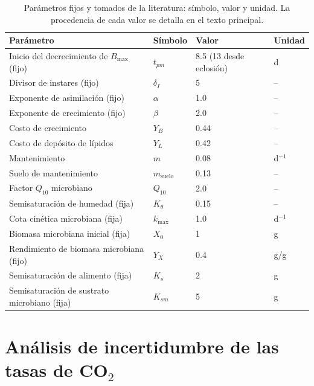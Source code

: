 \documentclass[11pt,a4paper]{article}
\begin{document}
\begin{table}[htbp]
\centering
\caption{Parámetros fijos y tomados de la literatura: símbolo, valor y unidad. La procedencia de cada valor se detalla en el texto principal.}
\label{tab:paramfijos}
\begin{tabular}{llll}
\toprule
Parámetro & Símbolo & Valor & Unidad \\
\midrule
Inicio del decrecimiento de $B_{\max}$ (fijo) & $t_{pm}$ & 8.5 (13 desde eclosión) & d \\
Divisor de instares (fijo) & $\delta_I$ & 5 & -- \\
Exponente de asimilación (fijo) & $\alpha$ & 1.0 & -- \\
Exponente de crecimiento (fijo) & $\beta$ & 2.0 & -- \\
Costo de crecimiento & $Y_B$ & 0.44 & -- \\
Costo de depósito de lípidos & $Y_L$ & 0.42 & -- \\
Mantenimiento & $m$ & 0.08 & d$^{-1}$ \\
Suelo de mantenimiento & $m_{\mathrm{suelo}}$ & 0.13 & -- \\
Factor $Q_{10}$ microbiano & $Q_{10}$ & 2.0 & -- \\
Semisaturación de humedad (fija) & $K_{\theta}$ & 0.15 & -- \\
Cota cinética microbiana (fija) & $k_{\max}$ & 1.0 & d$^{-1}$ \\
Biomasa microbiana inicial (fija) & $X_0$ & 1 & g \\
Rendimiento de biomasa microbiana (fijo) & $Y_X$ & 0.4 & g/g \\
Semisaturación de alimento (fija) & $K_s$ & 2 & g \\
Semisaturación de sustrato microbiano (fija) & $K_{sm}$ & 5 & g \\
\bottomrule
\end{tabular}
\end{table}

\section{Análisis de incertidumbre de las tasas de CO$_2$}
\label{sec:incertidumbre_si}
\end{document}
